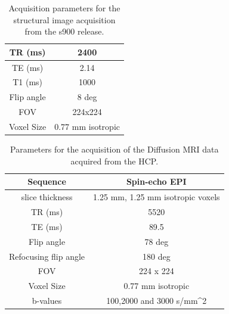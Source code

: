 \documentclass[msthesis.tex]{subfiles}
\begin{document}
\begin{table}[]
    \centering
    \begin{tabular}{|c|c|}
    \hline
         TR (ms) & 2400  \\
    \hline
         TE (ms) & 2.14 \\
    \hline
         T1 (ms) & 1000 \\
    \hline
         Flip angle & 8 deg \\
    \hline
         FOV & 224x224 \\
    \hline
         Voxel Size & 0.77 mm isotropic \\
    \hline
    \end{tabular}
    \caption{Acquisition parameters for the structural image acquisition from the s900 release. }
    \label{tab:structuralmri}
\end{table}

\begin{table}[]
\centering
    \begin{tabular}{|c|c|}
          \hline
         Sequence &  Spin-echo EPI \\
          \hline
         slice thickness & 1.25 mm, 1.25 mm isotropic voxels\\
          \hline
         TR (ms) & 5520  \\
          \hline
         TE (ms) & 89.5 \\
          \hline
         Flip angle & 78 deg \\
          \hline
         Refocusing flip angle & 180 deg \\
          \hline
         FOV & 224 x 224 \\
          \hline
        Voxel Size & 0.77 mm isotropic \\
          \hline
        b-values & 100,2000 and 3000 s/mm^{2}\\
         \hline
    \end{tabular}
    \caption{Parameters for the acquisition of the Diffusion MRI data acquired from the HCP.}
    \label{tab:diffusionmripara}
\end{table}
\end{document}
